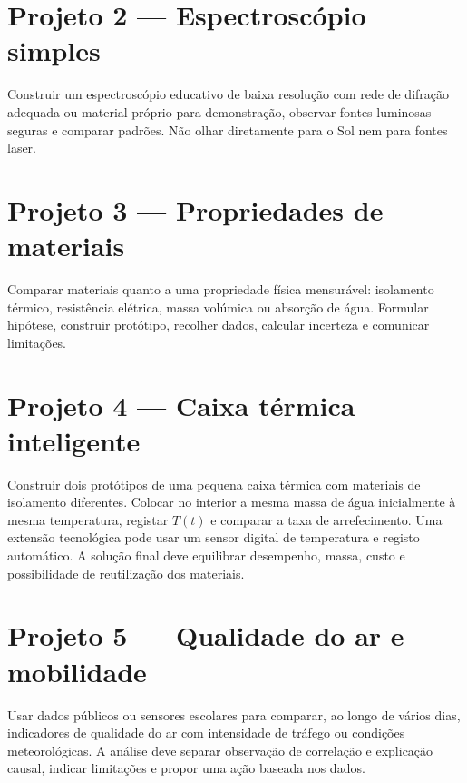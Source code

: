 \documentclass[11pt,a4paper,oneside]{book}
\begin{document}
\section{Projeto 2 — Espectroscópio simples}
Construir um espectroscópio educativo de baixa resolução com rede de difração adequada ou material próprio para demonstração, observar fontes luminosas seguras e comparar padrões. Não olhar diretamente para o Sol nem para fontes laser.

\section{Projeto 3 — Propriedades de materiais}
Comparar materiais quanto a uma propriedade física mensurável: isolamento térmico, resistência elétrica, massa volúmica ou absorção de água. Formular hipótese, construir protótipo, recolher dados, calcular incerteza e comunicar limitações.

\section{Projeto 4 — Caixa térmica inteligente}
Construir dois protótipos de uma pequena caixa térmica com materiais de isolamento diferentes. Colocar no interior a mesma massa de água inicialmente à mesma temperatura, registar $T(t)$ e comparar a taxa de arrefecimento. Uma extensão tecnológica pode usar um sensor digital de temperatura e registo automático. A solução final deve equilibrar desempenho, massa, custo e possibilidade de reutilização dos materiais.

\section{Projeto 5 — Qualidade do ar e mobilidade}
Usar dados públicos ou sensores escolares para comparar, ao longo de vários dias, indicadores de qualidade do ar com intensidade de tráfego ou condições meteorológicas. A análise deve separar observação de correlação e explicação causal, indicar limitações e propor uma ação baseada nos dados.
\end{document}
